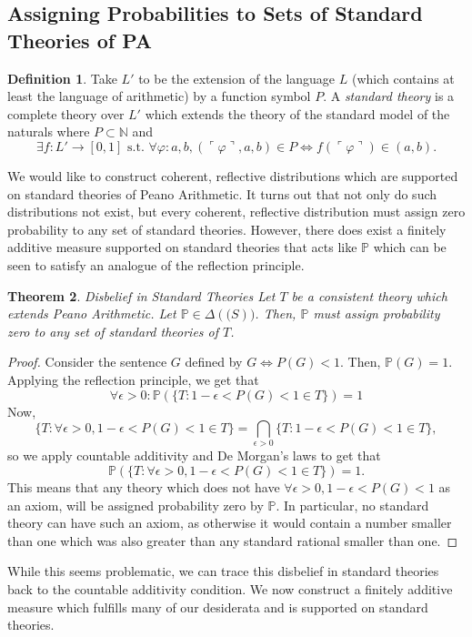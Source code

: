 \documentclass[12pt]{article}
\newcommand{\PP}{\mathbb{P}}
\theoremstyle{plain}
\newtheorem{theorem}{Theorem}[subsection]
\theoremstyle{definition}
\newtheorem{definition}[theorem]{Definition}
\theoremstyle{remark}
\begin{document}
\subsection{Assigning Probabilities to Sets of Standard Theories of PA}
\begin{definition}
Take $L'$ to be the extension of the language $L$ (which contains at least the language of arithmetic) by a function symbol $P$. A \emph{standard theory} is a complete theory over $L'$ which extends the theory of the standard model of the naturals where $P\subset\mathbb{N}$ and 
$$\exists f : L'\rightarrow[0, 1] \text{ s.t. } \forall \varphi: a, b, (\ulcorner \varphi \urcorner, a, b) \in P \iff f(\ulcorner \varphi \urcorner) \in (a, b).$$
\end{definition}
We would like to construct coherent, reflective distributions which are supported on standard theories of Peano Arithmetic. It turns out that not only do such distributions not exist, but every coherent, reflective distribution must assign zero probability to any set of standard theories. However, there does exist a finitely additive measure supported on standard theories that acts like $\PP$ which can be seen to satisfy an analogue of the reflection principle.
\begin{theorem} \emph{Disbelief in Standard Theories}
Let $T$ be a consistent theory which extends Peano Arithmetic.
Let $\PP\in\Delta(\mathcal(S))$.
Then, $\PP$ must assign probability zero to any set of standard theories of $T$.
\end{theorem}
\begin{proof}
Consider the sentence $G$ defined by $G \iff P(G) < 1$.
Then, $\mathbb{P}(G)=1$.
Applying the reflection principle, we get that 
$$\forall\epsilon>0: \mathbb{P}(\{T:1-\epsilon<P(G)<1\in T\})=1$$
Now, 
$$\{T:\forall \epsilon>0,1-\epsilon<P(G)<1\in T\}=\bigcap_{\epsilon>0}\{T:1-\epsilon<P(G)<1\in T\},$$ so we apply countable additivity and De Morgan's laws to get that $$\mathbb{P}(\{T:\forall \epsilon>0,1-\epsilon<P(G)<1\in T\})=1.$$
This means that any theory which does not have $\forall \epsilon>0,1-\epsilon<P(G)<1$ as an axiom, will be assigned probability zero by $\mathbb{P}$.
In particular, no standard theory can have such an axiom, as otherwise it would contain a number smaller than one which was also greater than any standard rational smaller than one.
\end{proof}
While this seems problematic, we can trace this disbelief in standard theories back to the countable additivity condition. We now construct a finitely additive measure which fulfills many of our desiderata and is supported on standard theories.
\end{document}
